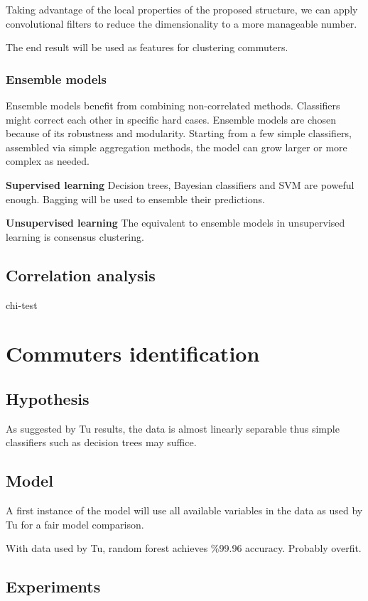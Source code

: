 \documentclass{article}
\begin{document}
Taking advantage of the local properties of the proposed structure, we can apply convolutional filters to reduce the dimensionality to a more manageable number. 

The end result will be used as features for clustering commuters. 

\subsubsection{Ensemble models}
Ensemble models benefit from combining non-correlated methods. Classifiers might correct each other in specific hard cases. Ensemble models are chosen because of its robustness and modularity. Starting from a few simple classifiers, assembled via simple aggregation methods, the model can grow larger or more complex as needed.

\textbf{Supervised learning}
Decision trees, Bayesian classifiers and SVM are poweful enough. Bagging will be used to ensemble their predictions.

\textbf{Unsupervised learning}
The equivalent to ensemble models in unsupervised learning is consensus clustering.


\subsection{Correlation analysis}
chi-test


\newpage
\section{Commuters identification}
\label{sec:partI}
\subsection{Hypothesis}
As suggested by Tu \cite{tu2016impact} results, the data is almost linearly separable thus simple classifiers such as decision trees may suffice. 


\subsection{Model}
A first instance of the model will use all available variables in the data as used by Tu \cite{tu2016impact} for a fair model comparison. 

With data used by Tu\cite{tu2016impact}, random forest achieves \%99.96 accuracy. Probably overfit.

\subsection{Experiments}
\end{document}
